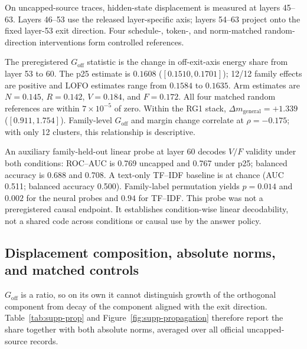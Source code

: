\documentclass[letterpaper]{article}
\begin{document}
On uncapped-source traces, hidden-state displacement is measured at layers 45--63.  Layers 46--53 use the released layer-specific axis; layers 54--63 project onto the fixed layer-53 exit direction.  Four schedule-, token-, and norm-matched random-direction interventions form controlled references.

The preregistered $G_{\mathrm{off}}$ statistic is the change in off-exit-axis energy share from layer 53 to 60.  The p25 estimate is $0.1608$ ($[0.1510,0.1701]$); 12/12 family effects are positive and LOFO estimates range from $0.1584$ to $0.1635$.  Arm estimates are $N=0.145$, $R=0.142$, $V=0.184$, and $F=0.172$.  All four matched random references are within $7\times10^{-5}$ of zero.  Within the RG1 stack, $\Delta m_{\mathrm{general}}=+1.339$ ($[0.911,1.754]$).  Family-level $G_{\mathrm{off}}$ and margin change correlate at $\rho=-0.175$; with only 12 clusters, this relationship is descriptive.

An auxiliary family-held-out linear probe at layer 60 decodes $V/F$ validity under both conditions: ROC--AUC is 0.769 uncapped and 0.767 under p25; balanced accuracy is 0.688 and 0.708.  A text-only TF--IDF baseline is at chance (AUC 0.511; balanced accuracy 0.500).  Family-label permutation yields $p=0.014$ and $0.002$ for the neural probes and $0.94$ for TF--IDF.  This probe was not a preregistered causal endpoint.  It establishes condition-wise linear decodability, not a shared code across conditions or causal use by the answer policy.

\subsection{Displacement composition, absolute norms, and matched controls}

$G_{\mathrm{off}}$ is a ratio, so on its own it cannot distinguish growth of the orthogonal component from decay of the component aligned with the exit direction. Table~\ref{tab:supp-prop} and Figure~\ref{fig:supp-propagation} therefore report the share together with both absolute norms, averaged over all official uncapped-source records.
\end{document}
